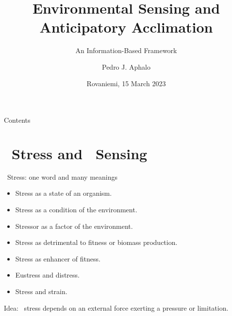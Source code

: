 \documentclass[11pt]{beamer}\usepackage[]{graphicx}\usepackage[]{xcolor}
\newcommand\arrowsicons[1]{{\lineaarrowsfont\symbol{#1}}}
\newcommand\stressicon{\colorbox{yellow}{\textcolor{black}{\arrowsicons{"E051}}}\xspace}
\newcommand\senseicon{\colorbox{green}{\textcolor{black}{\arrowsicons{"E028}}}\xspace}
\begin{document}

\title{Environmental Sensing and\\ Anticipatory Acclimation}
\subtitle{An Information-Based Framework}
\author{Pedro J. Aphalo}
\date{Rovaniemi, 15 March 2023}


	\begin{frame}
		\maketitle
	\end{frame}



\begin{frame}{Contents}
  \tableofcontents
\end{frame}

\section{\stressicon\ Stress and \senseicon\ Sensing}

\begin{frame}{\stressicon\ Stress: one word and many meanings}
  \begin{itemize}
    \item Stress as a state of an organism.
    \item Stress as a condition of the environment.
    \item Stressor as a factor of the environment.
    \item Stress as detrimental to fitness or biomass production.
    \item Stress as enhancer of fitness.
    \item Eustress and distress.
    \item Stress and strain.
  \end{itemize}
  Idea: \stressicon\ stress depends on an external force exerting a pressure or limitation.
\end{frame}
\end{document}
